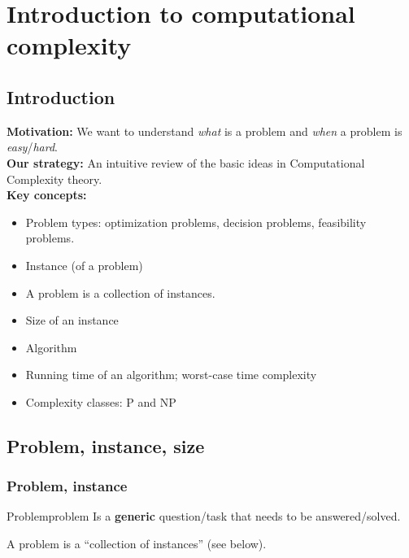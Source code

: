 

%
%

\chapter{Introduction to computational complexity}

\section{Introduction}

{\bf Motivation:} We want to understand {\em what} is a problem and {\em when} a problem is {\em easy}/{\em hard}.\\

{\bf Our strategy:} An intuitive review of the basic ideas in Computational Complexity theory.\\ 

{\bf Key concepts:}
	\begin{itemize}
		\item Problem types: optimization problems, decision problems, feasibility problems.
		\item Instance (of a problem)
		\item A problem is a collection of instances.
		\item Size of an instance
		\item Algorithm
		\item Running time of an algorithm; worst-case time complexity
		\item Complexity classes: ${\mathup{P}}$ and ${\mathup{NP}}$
\end{itemize}

\section{Problem, instance, size}
\subsection{Problem, instance}
\begin{definition}{Problem}{problem}
Is a {\bf generic} question/task that needs to be answered/solved. 

A problem is a ``collection of instances'' (see below).
\end{definition}


